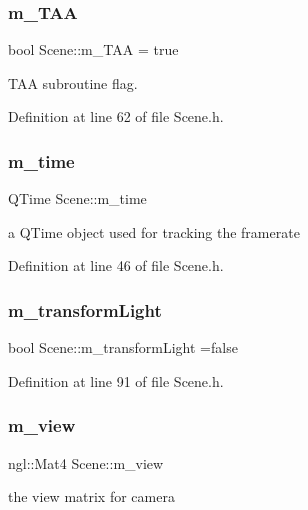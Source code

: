 \subsubsection{m\_TAA}
{\footnotesize\ttfamily bool Scene\+::m\+\_\+\+T\+AA = true\hspace{0.3cm}{\ttfamily [private]}}



T\+AA subroutine flag. 



Definition at line 62 of file Scene.\+h.

\mbox{\label{class_scene_a616401e5e3bab5b6a757190a50fb66cc}} 
\subsubsection{m\_time}
{\footnotesize\ttfamily Q\+Time Scene\+::m\+\_\+time\hspace{0.3cm}{\ttfamily [private]}}



a Q\+Time object used for tracking the framerate 



Definition at line 46 of file Scene.\+h.

\mbox{\label{class_scene_a50b268e97820bd18ac07f5e14378561e}} 
\subsubsection{m\_transformLight}
{\footnotesize\ttfamily bool Scene\+::m\+\_\+transform\+Light =false\hspace{0.3cm}{\ttfamily [private]}}



Definition at line 91 of file Scene.\+h.

\mbox{\label{class_scene_a6e6d6f0dab5600f0d16ceedbb4ea5c29}} 
\subsubsection{m\_view}
{\footnotesize\ttfamily ngl\+::\+Mat4 Scene\+::m\+\_\+view\hspace{0.3cm}{\ttfamily [private]}}



the view matrix for camera 




